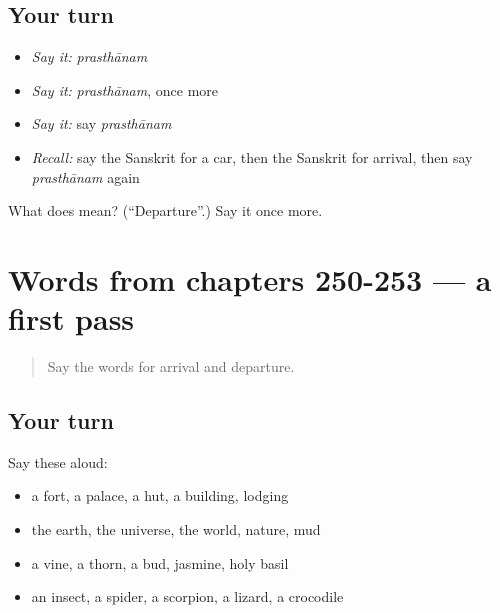 \subsection*{Your turn}
\begin{itemize}
\raggedright
  \item \emph{Say it:} \emph{prasthānam}
  \item \emph{Say it:} \emph{prasthānam}, once more
  \item \emph{Say it:} say \emph{prasthānam}
  \item \emph{Recall:} say the Sanskrit for a car, then the Sanskrit for arrival, then say \emph{prasthānam} again
\end{itemize}

\begin{tcolorbox}[breakable,colback=teal!4,colframe=teal!35!black,title={Before you move on}]
What does  mean? (\textquotedblleft{}Departure\textquotedblright{}.) Say it once more.
\end{tcolorbox}
\section[(dialogue)]{Words from chapters 250-253 — a first pass}

\label{lesson:SA-R257-first-pass-words-from-chapters-250-253}



\begin{quote}
Say the words for arrival and departure.
\end{quote}

\subsection*{Your turn}
Say these aloud:

\begin{itemize}
\raggedright
  \item a fort, a palace, a hut, a building, lodging
  \item the earth, the universe, the world, nature, mud
  \item a vine, a thorn, a bud, jasmine, holy basil
  \item an insect, a spider, a scorpion, a lizard, a crocodile
\end{itemize}

